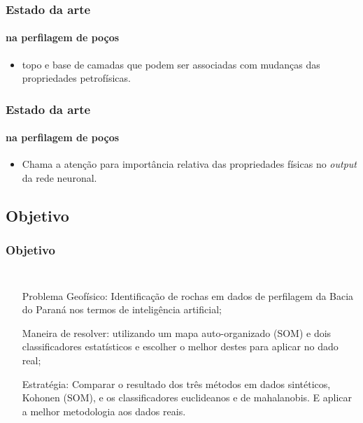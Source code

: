 \documentclass[aspectratio=10]{beamer} %
\begin{document}
\begin{frame}
\frametitle{Estado da arte}
\framesubtitle{na perfilagem de poços}
\begin{small}
\end{small}
\begin{itemize}
\item topo e base de camadas que podem ser associadas com mudanças das propriedades petrofísicas. 
\end{itemize}
\end{frame}

\begin{frame}
\frametitle{Estado da arte}
\framesubtitle{na perfilagem de poços}
\begin{small}
\end{small}
\begin{itemize}
\item Chama a atenção para importância relativa das propriedades físicas no \textit{output} da rede neuronal. 
\end{itemize}
\end{frame}

\subsection{Objetivo}

\begin{frame}
	\frametitle{Objetivo}
	\begin{columns}\footnotesize 
		\justifying
		\begin{itemize}
			\item[Problema Geofísico:] Identificação de rochas em dados de perfilagem da Bacia do Paraná nos termos de inteligência artificial;
			\pause
			\item[Maneira de resolver:] utilizando um mapa auto-organizado (SOM)  e dois classificadores estatísticos e escolher o melhor destes para aplicar no dado real;
			\pause
			\item[Estratégia:] Comparar o resultado dos três métodos em dados sintéticos, Kohonen (SOM),  e os classificadores euclideanos e de mahalanobis. E aplicar a melhor metodologia aos dados reais. 
		\end{itemize}
	\end{columns}
\end{frame}
\end{document}
